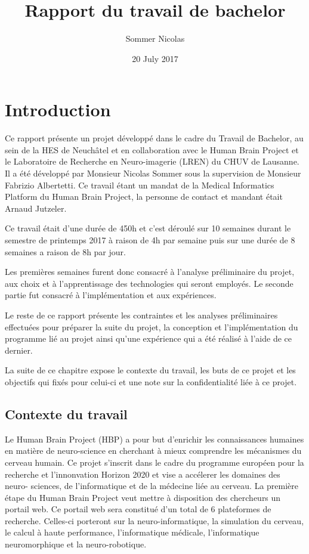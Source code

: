 \documentclass[a4paper,10pt,openany,oneside]{sphinxmanual}
\title{Rapport du travail de bachelor}
\date{20 July 2017}
\author{Sommer Nicolas}
\begin{document}
\maketitle
\tableofcontents
{}\label{index::doc}



\chapter{Introduction}
\label{index:introduction}\label{index:rapport-du-travail-de-bachelor}
Ce rapport présente un projet développé dans le cadre du Travail de Bachelor, au sein de la HES de Neuchâtel
et en collaboration avec le Human Brain Project et le Laboratoire de Recherche en Neuro-imagerie (LREN)
du CHUV de Lausanne. Il a été développé par Monsieur Nicolas Sommer sous la supervision de Monsieur
Fabrizio Albertetti. Ce travail étant un mandat de la Medical Informatics Platform du Human Brain Project,
la personne de contact et mandant était Arnaud Jutzeler.

Ce travail était d'une durée de 450h et c'est déroulé sur 10 semaines durant le semestre de
printemps 2017 à raison de 4h par semaine puis sur une durée de 8 semaines a raison de 8h par
jour.

Les premières semaines furent donc consacré à l'analyse préliminaire du projet, aux choix et à
l'apprentissage des technologies qui seront employés. Le seconde partie fut consacré à l'implémentation
et aux expériences.

Le reste de ce rapport présente les contraintes et les analyses préliminaires effectuées pour préparer
la suite du projet, la conception et l'implémentation du programme lié au projet ainsi qu'une expérience
qui a été réalisé à l'aide de ce dernier.

La suite de ce chapitre expose le contexte du travail, les buts de ce projet et les objectifs qui fixés pour
celui-ci et une note sur la confidentialité liée à ce projet.


\section{Contexte du travail}
\label{index:contexte-du-travail}
Le Human Brain Project (HBP) a pour but d'enrichir les connaissances humaines en matière de neuro-science
en cherchant à mieux comprendre les mécanismes du cerveau humain. Ce projet s'inscrit dans le cadre du
programme européen pour la recherche et l'innonvation Horizon 2020 et vise a accélerer les domaines des neuro-
sciences, de l'informatique et de la médecine liée au cerveau. La première étape du Human Brain Project veut
mettre à disposition des chercheurs un portail web. Ce portail web sera constitué d'un total de 6 plateformes
de recherche. Celles-ci porteront sur la neuro-informatique, la simulation du cerveau, le calcul à haute performance,
l'informatique médicale, l'informatique neuromorphique et la neuro-robotique.
\end{document}

